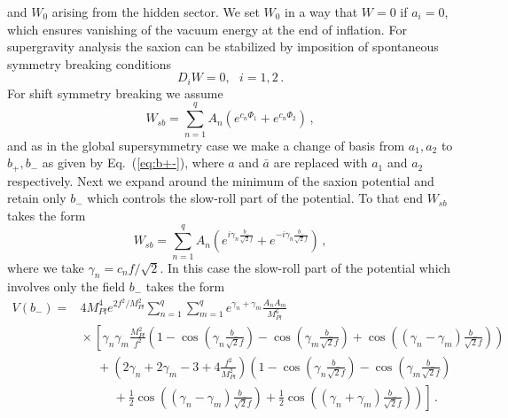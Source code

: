 \documentclass[12pt]{article}
\begin{document}
and $W_0$ arising from the hidden sector. We set $W_0$ in a way that $W = 0$ if $a_i = 0$, which ensures vanishing of the vacuum energy at the end of inflation.
For supergravity analysis the saxion can be stabilized by imposition of spontaneous symmetry breaking conditions~\cite{Nath:1983aw}
\begin{equation}
  D_i W = 0,
  ~~~ i = 1, 2\,.
\end{equation}
For shift symmetry breaking we assume
\begin{equation}
  W_{sb} = \sum_{n = 1}^q A_n \left(e^{c_n \Phi_1} + e^{c_n \Phi_2}\right)\,,
\end{equation}
and as in the global supersymmetry case we make a change of basis from $a_1, a_2$ to $b_+, b_-$ as given by Eq.~(\ref{eq:b+-}), where $a$ and $\bar a$ are replaced with $a_1$ and $a_2$ respectively.
Next we expand around the minimum of the saxion potential and retain only $b_-$ which controls the slow-roll part of the potential.
To that end $W_{sb}$ takes the form
\begin{equation}
  W_{sb} = \sum_{n = 1}^q A_n \left(
      e^{i \gamma_n \frac{b_-}{\sqrt{2} f}}
    + e^{-i \gamma_n \frac{b_-}{\sqrt{2} f}}
  \right)\,,
\end{equation}
where we take $\gamma_n = c_n f / \sqrt{2}$.
In this case the slow-roll part of the potential which involves only the field $b_-$ takes the form
\begin{equation} \label{eq:supergravity:Vslow}
  \begin{aligned}
    V\left(b_-\right) =
      & 4 M_{Pl}^4 e^{2 f^2 / M_{Pl}^2} \sum_{n = 1}^q \sum_{m = 1}^q
        e^{\gamma_n + \gamma_m} \frac{A_n A_m}{M_{Pl}^6}\\
        &{} \times \left[
          \gamma_n \gamma_m \frac{M_{Pl}^2}{f^2} \left(
              1
            - \cos\left(\gamma_n \frac{b_-}{\sqrt{2} f}\right)
            - \cos\left(\gamma_m \frac{b_-}{\sqrt{2} f}\right)
            + \cos\left(\left(\gamma_n - \gamma_m\right) \frac{b_-}{\sqrt{2} f}\right)
          \right)\right.\\
          &~~~~~~ + \left(2 \gamma_n + 2 \gamma_m - 3 + 4 \frac{f^2}{M_{Pl}^2}\right) \left(
              1
            - \cos\left(\gamma_n \frac{b_-}{\sqrt{2} f}\right)
            - \cos\left(\gamma_m \frac{b_-}{\sqrt{2} f}\right)\right.\\
            &~~~~~~~~~~~~ \left.\left.{}
            + \frac{1}{2} \cos\left(\left(\gamma_n - \gamma_m\right) \frac{b_-}{\sqrt{2} f}\right)
            + \frac{1}{2} \cos\left(\left(\gamma_n + \gamma_m\right) \frac{b_-}{\sqrt{2} f}\right)
          \right)
        \right]\,.
  \end{aligned}
\end{equation}
\end{document}
